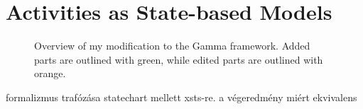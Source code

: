 \section{Activities as State-based Models}

\begin{figure}[!ht]
	\centering
	
	\caption{Overview of my modification to the Gamma framework. Added parts are outlined with green, while edited parts are outlined with orange.}
	\label{fig:gamma-activity-overview}
\end{figure}

formalizmus trafózása statechart mellett xsts-re. a végeredmény miért ekvivalens
